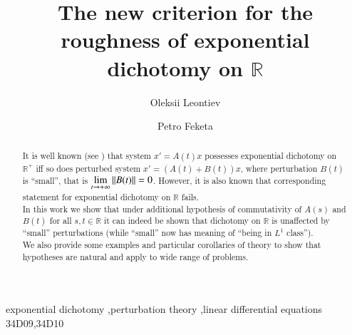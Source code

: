 \documentclass{elsarticle}
\theoremstyle{remark}
\begin{document}
\begin{frontmatter}

\title{The new criterion for the roughness of exponential dichotomy on $\mathbb{R}$}

\author[todai]{Oleksii Leontiev}
\author[erfurt]{Petro Feketa}


\address[todai]{The University of Tokyo}
\address[erfurt]{Erfurt University of Applied Sciences}

\begin{abstract}
	It is well known (see \cite{palmer1984exponential})
	that system $x'=A(t)x$ possesses exponential dichotomy on $\mathbb{R}^+$ iff so does perturbed system
	$x'=(A(t)+B(t))x$, where perturbation $B(t)$ is ``small'', that is $\lim_{t\to+\infty}\mynorm{B(t)}=0$. However, it is also
	known that corresponding statement for exponential dichotomy on $\mathbb{R}$ fails.\\
	In this work we show that under additional hypothesis of commutativity of $A(s)$ and $B(t)$ for all $s,t\in\mathbb{R}$
	it can indeed be shown that dichotomy on $\mathbb{R}$ is unaffected by ``small'' perturbations (while ``small'' now
	has meaning of ``being in $L^1$ class'').\\
	We also provide some examples and particular corollaries of theory to show that hypotheses are natural and apply to wide
	range of problems.
\end{abstract}

\begin{keyword}
exponential dichotomy \sep perturbation theory \sep linear differential equations
\MSC[2010] 34D09\sep 34D10
\end{keyword}

\end{frontmatter}

\linenumbers
\end{document}
